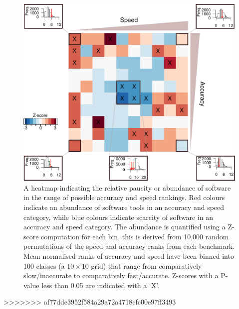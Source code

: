 \documentclass[fleqn,10pt]{SelfArx} %
\begin{document}
\begin{figure}
\includegraphics[scale=0.55]{figure2.pdf}
\caption{A heatmap indicating the relative paucity or abundance of software in the range of possible accuracy and speed rankings. Red colours indicate an abundance of software tools in an accuracy and speed category, while blue colours indicate scarcity of software in an accuracy and speed category. The abundance is quantified using a Z-score computation for each bin, this is derived from 10,000 random permutations of the speed and accuracy ranks from each benchmark. Mean normalised ranks of accuracy and speed have been binned into 100 classes (a $10\times10$ grid) that range from comparatively slow/inaccurate to comparatively fast/accurate. Z-scores with a P-value less than 0.05 are indicated with a ‘X’.}
\label{fig:speedaccuracy}
\end{figure}

>>>>>>> af77dde3952f584a29a72a4718cfc00e97ff3493
\end{document}
